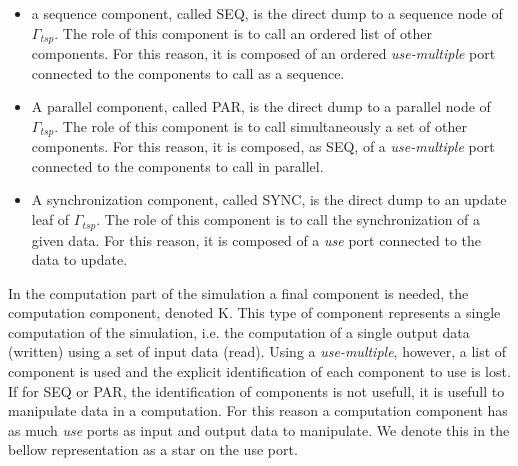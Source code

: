 \begin{itemize}
\item a sequence component, called SEQ, is the direct dump to a sequence node of $\Gamma_{tsp}$. The role of this component is to call an ordered list of other components. For this reason, it is composed of an ordered \emph{use-multiple} port connected to the components to call as a sequence.


\item A parallel component, called PAR, is the direct dump to a parallel node of $\Gamma_{tsp}$. The role of this component is to call simultaneously a set of other components. For this reason, it is composed, as SEQ, of a \emph{use-multiple} port connected to the components to call in parallel.


\item A synchronization component, called SYNC, is the direct dump to an update leaf of $\Gamma_{tsp}$. The role of this component is to call the synchronization of a given data. For this reason, it is composed of a \emph{use} port connected to the data to update.

\end{itemize}

In the computation part of the simulation a final component is needed, the computation component, denoted K. This type of component represents a single computation of the simulation, i.e. the computation of a single output data (written) using a set of input data (read). Using a \emph{use-multiple}, however, a list of component is used and the explicit identification of each component to use is lost. If for SEQ or PAR, the identification of components is not usefull, it is usefull to manipulate data in a computation. For this reason a computation component has as much \emph{use} ports as input and output data to manipulate. We denote this in the bellow representation as a star on the use port.

